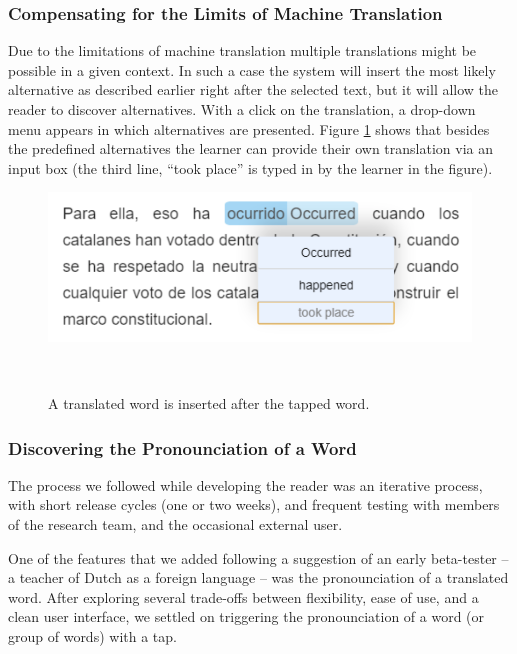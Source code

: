 \subsubsection{Compensating for the Limits of Machine Translation}
Due to the limitations of machine translation multiple translations might be possible in a given context. In such a case the system will insert the most likely alternative as described earlier right after the selected text, but it will allow the reader to discover alternatives. With a click on the translation, a drop-down menu appears in which alternatives are presented. Figure \ref{fig:registrations} shows that besides the predefined alternatives the learner can provide their own translation via an input box (the third line, ``took place'' is typed in by the learner in the figure). 


\begin{figure}[h!]
\centering
  \includegraphics[width=0.75\columnwidth]{figures/translation_alter_menu}
  \caption{A translated word is inserted after the tapped word.}~\label{fig:registrations}
\end{figure}

\subsubsection{Discovering the Pronounciation of a Word}

The process we followed while developing the reader was an iterative process, with short release cycles (one or two weeks), and frequent testing with members of the research team, and the occasional external user. 

One of the features that we added following a suggestion of an early beta-tester -- a teacher of Dutch as a foreign language -- was the pronounciation of a translated word. After exploring several trade-offs between flexibility, ease of use, and a clean user interface, we settled on triggering the pronounciation of a word (or group of words) with a tap. 


